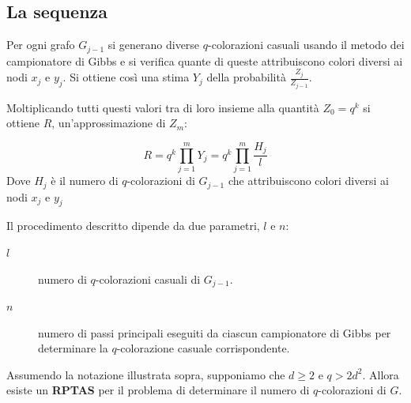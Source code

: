 \documentclass[\main/main.tex]{subfiles}
\begin{document}
\subsection{La sequenza}
Per ogni grafo \(G_{j-1}\) si generano diverse \(q\)-colorazioni casuali usando il metodo dei campionatore di Gibbs e si verifica quante di queste attribuiscono colori diversi ai nodi \(x_j\) e \(y_j\). Si ottiene così una stima \(Y_j\) della probabilità \(\frac{Z_j}{Z_{j-1}}\).

Moltiplicando tutti questi valori tra di loro insieme alla quantità \(Z_0 = q^k\) si ottiene \(R\), un'approssimazione di \(Z_m\):

\[
  R = q^k \prod_{j=1}^m Y_j = q^k \prod_{j=1}^m \frac{H_j}{l}
\]
Dove \(H_j\) è il numero di \(q\)-colorazioni di \(G_{j-1}\) che attribuiscono colori diversi ai nodi \(x_j\) e \(y_j\)

Il procedimento descritto dipende da due parametri, \(l\) e \(n\):
\begin{description}
  \item[\(l\)] numero di \(q\)-colorazioni casuali di \(G_{j-1}\).
  \item[\(n\)] numero di passi principali eseguiti da ciascun campionatore di Gibbs per determinare la \(q\)-colorazione casuale corrispondente.
\end{description}

\begin{theorem}
  Assumendo la notazione illustrata sopra, supponiamo che \(d\geq2\) e \(q>2d^2\). Allora esiste un \textbf{RPTAS} per il problema di determinare il numero di \(q\)-colorazioni di \(G\).
\end{theorem}
\end{document}
